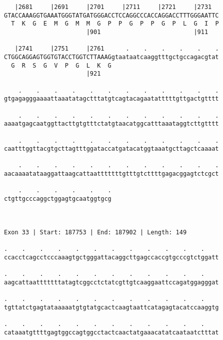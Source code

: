 \documentclass{article}
\begin{document}
\begin{Verbatim}
   |2681     |2691     |2701     |2711     |2721     |2731  
GTACCAAAGGTGAAATGGGTATGATGGGACCTCCAGGCCCACCAGGACCTTTGGGAATTC
  T  K  G  E  M  G  M  M  G  P  P  G  P  P  G  P  L  G  I  P
                       |901                          |911   
  
   |2741     |2751     |2761      .    .    .    .    .    .
CTGGCAGGAGTGGTGTACCTGGTCTTAAAGgtaataatcaaggtttgctgccagacgtat
  G  R  S  G  V  P  G  L  K  G                              
                       |921                                 
  
    .    .    .    .    .    .    .    .    .    .    .    .
gtgagagggaaaattaaatatagctttatgtcagtacagaatatttttgttgactgtttt
                                                            
    .    .    .    .    .    .    .    .    .    .    .    .
aaaatgagcaatggttacttgtgtttctatgtaacatggcatttaaataggtcttgtttt
                                                            
    .    .    .    .    .    .    .    .    .    .    .    .
caatttggttacgtgcttagtttggataccatgatacatggtaaatgcttagctcaaaat
                                                            
    .    .    .    .    .    .    .    .    .    .    .    .
aacaaaatataaggattaagcattaatttttttgtttgtcttttgagacggagtctcgct
                                                            
    .    .    .    .    .    .
ctgttgcccaggctggagtgcaatggtgcg
                              
                              
 
Exon 33 | Start: 187753 | End: 187902 | Length: 149
 
.    .    .    .    .    .    .    .    .    .    .    .    
ccacctcagcctcccaaagtgctgggattacaggcttgagccaccgtgcccgtctggatt
                                                            
.    .    .    .    .    .    .    .    .    .    .    .    
aagcattaatttttttatagtcggcctctatcgttgtcaaggaattccagatggagggat
                                                            
.    .    .    .    .    .    .    .    .    .    .    .    
tgttatctgagtataaaaatgtgtatgcactcaagtaattcatagagtacatccaaggtg
                                                            
.    .    .    .    .    .    .    .    .    .    .    .    
cataaatgttttgagtggccagtggcctactcaactatgaaacatatcaataatctttat
                                                            

\end{Verbatim}
\end{document}
